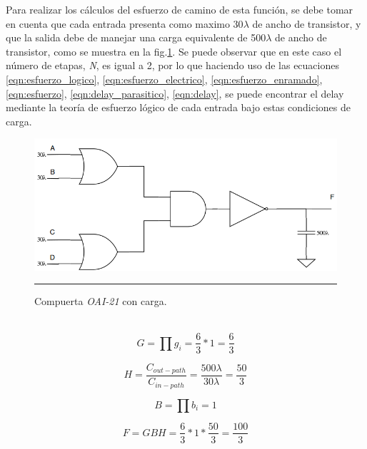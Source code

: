 \documentclass[12pt,a4paper]{article} %
\begin{document}
{Para realizar los cálculos del esfuerzo de camino de esta función, se debe tomar en cuenta que cada entrada presenta como maximo 30$\lambda$ de ancho de transistor, y que la salida debe de manejar una carga equivalente de 500$\lambda$ de ancho de transistor, como se muestra en la fig.\ref{fig:OAI21_Cargas}. Se puede observar que en este caso el número de etapas, \textit{N}, es igual a 2, por lo que haciendo uso de las ecuaciones \ref{eqn:esfuerzo_logico}, \ref{eqn:esfuerzo_electrico}, \ref{eqn:esfuerzo_enramado}, \ref{eqn:esfuerzo}, \ref{eqn:delay_parasitico}, \ref{eqn:delay}, se puede encontrar el delay mediante la teoría de esfuerzo lógico de cada entrada bajo estas condiciones de carga.\\

\begin{figure}[htbp]
  \centering
    \includegraphics[scale=0.5]{./OAI21_Cargas.png}
    \rule{35em}{0.5pt}
  \caption[IdealvsSim]{Compuerta \textit{OAI-21} con carga.}
  \label{fig:OAI21_Cargas}
\end{figure}\\


\begin{equation}\label{eqn:esfuerzo_logico2}
G= \prod g_{i}= \frac{6}{3} * 1 = \frac{6}{3}
\end{equation}

\begin{equation}\label{eqn:esfuerzo_electrico2}
H= \frac{C_{out-path}}{C_{in-path}} = \frac{500\lambda}{30\lambda} = \frac{50}{3}
\end{equation}

\begin{equation}\label{eqn:esfuerzo_enramado2}
B= \prod b_{i} = 1
\end{equation}

\begin{equation}\label{eqn:esfuerzo2}
F = GBH = \frac{6}{3}*1*\frac{50}{3} = \frac{100}{3}
\end{equation}

}
\end{document}

